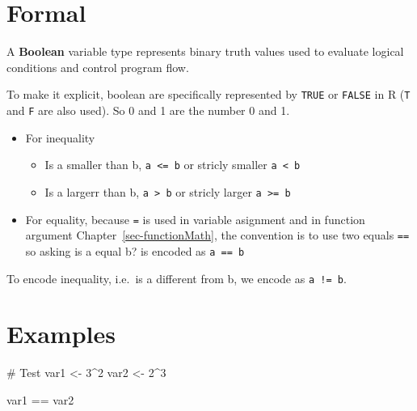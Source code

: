\documentclass[
  letterpaper,
  DIV=11,
  numbers=noendperiod]{scrreprt}
\newenvironment{Shaded}{\begin{snugshade}}{\end{snugshade}}
\newcommand{\CommentTok}[1]{\textcolor[rgb]{0.37,0.37,0.37}{#1}}
\newcommand{\DecValTok}[1]{\textcolor[rgb]{0.68,0.00,0.00}{#1}}
\newcommand{\NormalTok}[1]{\textcolor[rgb]{0.00,0.23,0.31}{#1}}
\newcommand{\OtherTok}[1]{\textcolor[rgb]{0.00,0.23,0.31}{#1}}
\newcommand{\SpecialCharTok}[1]{\textcolor[rgb]{0.37,0.37,0.37}{#1}}
\providecommand{\tightlist}{%
  \setlength{\itemsep}{0pt}\setlength{\parskip}{0pt}}
\begin{document}
\section*{Formal}\label{formal-32}


A \textbf{Boolean} variable type represents binary truth values used to
evaluate logical conditions and control program flow.

To make it explicit, boolean are specifically represented by
\texttt{TRUE} or \texttt{FALSE} in R (\texttt{T} and \texttt{F} are also
used). So 0 and 1 are the number 0 and 1.

\begin{itemize}
\tightlist
\item
  For inequality

  \begin{itemize}
  \tightlist
  \item
    Is a smaller than b, \texttt{a\ \textless{}=\ b} or stricly smaller
    \texttt{a\ \textless{}\ b}
  \item
    Is a largerr than b, \texttt{a\ \textgreater{}\ b} or stricly larger
    \texttt{a\ \textgreater{}=\ b}
  \end{itemize}
\item
  For equality, because \texttt{=} is used in variable asignment and in
  function argument Chapter~\ref{sec-functionMath}, the convention is to
  use two equals \texttt{==} so asking is a equal b? is encoded as
  \texttt{a\ ==\ b}
\end{itemize}

To encode inequality, i.e.~is a different from b, we encode as
\texttt{a\ !=\ b}.

\section*{Examples}\label{examples-31}


\begin{Shaded}
\begin{Highlighting}[]
\CommentTok{\# Test}
\NormalTok{var1 }\OtherTok{\textless{}{-}} \DecValTok{3}\SpecialCharTok{\^{}}\DecValTok{2}
\NormalTok{var2 }\OtherTok{\textless{}{-}} \DecValTok{2}\SpecialCharTok{\^{}}\DecValTok{3}

\NormalTok{var1 }\SpecialCharTok{==}\NormalTok{ var2}
\end{Highlighting}
\end{Shaded}
\end{document}
